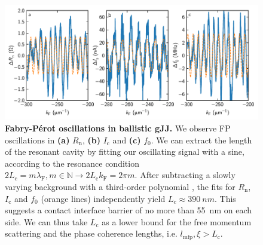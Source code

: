 \begin{figure}[]
	\centering
	\includegraphics[width=\linewidth]{chapter-gJJ/figs/si_fabryperot}
	\caption{{\bf Fabry-P\'erot oscillations in ballistic gJJ.}
		We observe FP oscillations in \textbf{(a)} $R_\text{n}$, \textbf{(b)} $I_\text{c}$ and \textbf{(c)} $f_0$.
		We can extract the length of the resonant cavity by fitting our oscillating signal with a sine, according to the resonance condition $2L_\text{c} = m\lambda_\text{F}, m\in\mathbb{N} \rightarrow 2L_\text{c} k_\text{F} = 2\pi m$.
		After subtracting a slowly varying background with a third-order polynomial \cite{caladoBallisticJosephsonJunctions2015d}, the fits for $R_\text{n}$, $I_\text{c}$ and $f_0$ (orange lines) independently yield $L_\text{c}\approx \SI{390}{nm}$.
		This suggests a contact interface barrier of no more than \SI{55}{nm} on each side.
		We can thus take $L_\text{c}$ as a lower bound for the free momentum scattering and the phase coherence lengths, i.e. $l_\text{mfp},\xi>L_\text{c}$.        }
	\label{fig:fabry-perot}
\end{figure}

